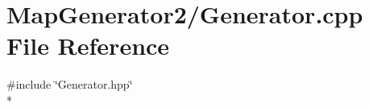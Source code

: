 \section{Map\-Generator2/\-Generator.cpp File Reference}
\label{_generator_8cpp}
{\ttfamily \#include \char`\"{}Generator.\-hpp\char`\"{}}\\*
